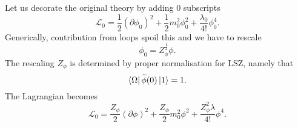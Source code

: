 
Let us decorate the original theory by adding $0$ subscripts
\begin{equation}
  \mathscr{L}_0 = \frac{1}{2} (\partial \phi_0)^2 + \frac{1}{2} m_0^2 \phi_0^2 + \frac{\lambda_0}{4!}\phi_0^4.
\end{equation}
Generically, contribution from loops spoil this and we have to rescale 
\begin{equation}
  \phi_0 = Z_{\phi}^{\frac{1}{2}} \phi.
\end{equation}
The rescaling $Z_\phi$  is determined by proper normalisation for LSZ, namely that 
\begin{equation}
  \bra{\Omega} \widetilde{\phi}(0) \ket{1} = 1.
\end{equation}
The Lagrangian becomes
\begin{equation}
  \mathscr{L}_0 = \frac{Z_\phi}{2} (\partial \phi)^2 + \frac{Z_\phi}{2}m_0^2 \phi^2 + \frac{Z_\phi^2\lambda}{4!} \phi^4.
\end{equation}

